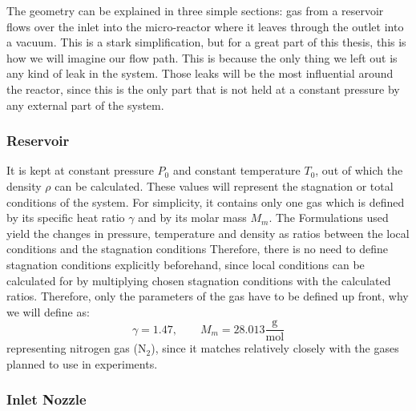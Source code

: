 	The geometry can be explained in three simple sections: gas from a reservoir flows over the inlet into the micro-reactor where it leaves through the outlet into a vacuum. 
	This is a stark simplification, but for a great part of this thesis, this is how we will imagine our flow path.
	This is because the only thing we left out is any kind of leak in the system.
	Those leaks will be the most influential around the reactor, since this is the only part that is not held at a constant pressure by any external part of the system.\\
\subsubsection*{Reservoir}

	It is kept at constant pressure $P_0$ and constant temperature $T_0$, out of which the density $\rho$ can be calculated.
	These values will represent the stagnation or total conditions of the system.
	For simplicity, it contains only one gas which is defined by its specific heat ratio $\gamma$ and by its molar mass $M_m$.
	The Formulations used yield the changes in pressure, temperature and density as ratios between the local conditions and the stagnation conditions
	Therefore, there is no need to define stagnation conditions explicitly beforehand, since local conditions can be calculated for by multiplying chosen stagnation conditions with the calculated ratios.
	Therefore, only the parameters of the gas have to be defined up front, why we will define as:
	$$
		\gamma = 1.47, \qquad M_m = 28.013 \frac{\text{g}}{\text{mol}}
	$$
	representing nitrogen gas ($\text{N}_2$), since it matches relatively closely with the gases planned to use in experiments.
\subsubsection*{Inlet Nozzle}


